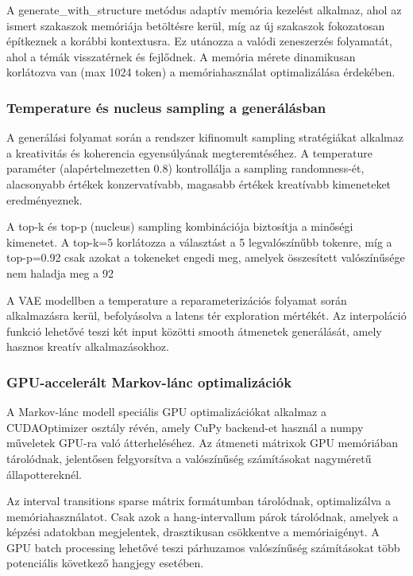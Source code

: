 A generate_with_structure metódus adaptív memória kezelést alkalmaz, ahol az ismert szakaszok memóriája betöltésre kerül, míg az új szakaszok fokozatosan építkeznek a korábbi kontextusra. Ez utánozza a valódi zeneszerzés folyamatát, ahol a témák visszatérnek és fejlődnek. A memória mérete dinamikusan korlátozva van (max 1024 token) a memóriahasználat optimalizálása érdekében.

\subsubsection{Temperature és nucleus sampling a generálásban}
A generálási folyamat során a rendszer kifinomult sampling stratégiákat alkalmaz a kreativitás és koherencia egyensúlyának megteremtéséhez. A temperature paraméter (alapértelmezetten 0.8) kontrollálja a sampling randomness-ét, alacsonyabb értékek konzervatívabb, magasabb értékek kreatívabb kimeneteket eredményeznek. 

A top-k és top-p (nucleus) sampling kombinációja biztosítja a minőségi kimenetet. A top-k=5 korlátozza a választást a 5 legvalószínűbb tokenre, míg a top-p=0.92 csak azokat a tokeneket engedi meg, amelyek összesített valószínűsége nem haladja meg a 92%

A VAE modellben a temperature a reparameterizációs folyamat során alkalmazásra kerül, befolyásolva a latens tér exploration mértékét. Az interpoláció funkció lehetővé teszi két input közötti smooth átmenetek generálását, amely hasznos kreatív alkalmazásokhoz.

\subsubsection{GPU-accelerált Markov-lánc optimalizációk}
A Markov-lánc modell speciális GPU optimalizációkat alkalmaz a CUDAOptimizer osztály révén, amely CuPy backend-et használ a numpy műveletek GPU-ra való átterheléséhez. Az átmeneti mátrixok GPU memóriában tárolódnak, jelentősen felgyorsítva a valószínűség számításokat nagyméretű állapottereknél.

Az interval transitions sparse mátrix formátumban tárolódnak, optimalizálva a memóriahasználatot. Csak azok a hang-intervallum párok tárolódnak, amelyek a képzési adatokban megjelentek, drasztikusan csökkentve a memóriaigényt. A GPU batch processing lehetővé teszi párhuzamos valószínűség számításokat több potenciális következő hangjegy esetében.

